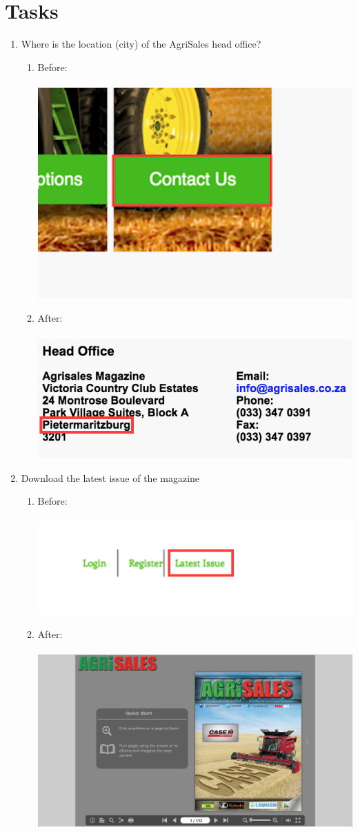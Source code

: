 \documentclass[11pt]{article}
\begin{document}
\section{Tasks}
	\begin{enumerate}
		\item Where is the location (city) of the AgriSales head office?
				\begin{enumerate}
					\item Before: \\ \\
						\includegraphics[width=0.3\linewidth]{../Images/Tasks/Task1Before}
					\item After: \\ \\
						\includegraphics[width=0.5\linewidth]{../Images/Tasks/Task1After}
				\end{enumerate}
		\item Download the latest issue of the magazine
			\begin{enumerate}
				\item Before: \\ \\
					\includegraphics[width=0.7\linewidth]{../Images/Tasks/Task2Before}
				\item After: \\ \\
					\includegraphics[width=0.5\linewidth]{../Images/Tasks/Task2After}

\end{enumerate}
\end{enumerate}
\end{document}

